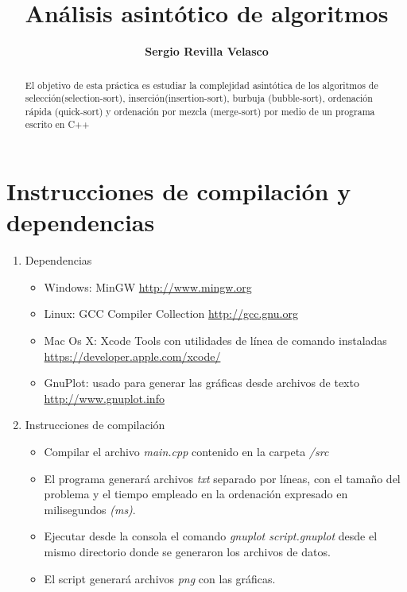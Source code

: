 \documentclass[11pt]{article}
\title{\huge{\textbf{Análisis asintótico de algoritmos}}}
\author{\large{\textbf{Sergio Revilla Velasco}}}
\date{}
\begin{document}
\maketitle


\begin{abstract}
El objetivo de esta práctica es estudiar la complejidad asint\'otica de los algoritmos de selecci\'on(selection-sort), inserci\'on(insertion-sort), burbuja (bubble-sort), ordenaci\'on r\'apida (quick-sort) y ordenaci\'on por mezcla (merge-sort) por medio de un programa escrito en C++
\end{abstract}

\tableofcontents{}
\newpage

\section{Instrucciones de compilación y dependencias}
\begin{enumerate}
	\item Dependencias
		\begin{itemize}
			\item Windows: MinGW  \url{http://www.mingw.org}
			\item Linux: GCC Compiler Collection  \url{http://gcc.gnu.org}
			\item Mac Os X: Xcode Tools con utilidades de línea de comando instaladas  							\url{https://developer.apple.com/xcode/}
			\item GnuPlot: usado para generar las gr\'aficas desde archivos de texto 								\url{http://www.gnuplot.info}
		\end{itemize}
	\item Instrucciones de compilaci\'on
			\begin{itemize}
			\item Compilar el archivo \emph{main.cpp} contenido en la carpeta \emph{/src}
			\item El programa generar\'a archivos \emph{txt} separado por l\'ineas, con el tamaño 				del problema y el tiempo empleado en la ordenaci\'on expresado en milisegundos 					\emph{(ms)}.  
			\item Ejecutar desde la consola el comando \emph{gnuplot script.gnuplot} desde el 					mismo directorio donde se generaron los archivos de datos.
			\item El script generar\'a archivos \emph{png} con las gr\'aficas.
			\end{itemize}
\end{enumerate}
\end{document}
